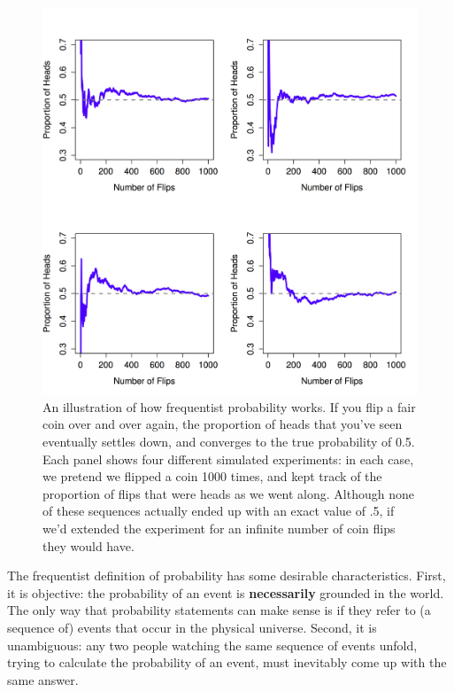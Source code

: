 \documentclass[
]{book}
\begin{document}
\begin{figure}
\centering
\includegraphics{navarro_img/probability/frequentistProb-eps-converted-to.png}
\caption{\label{fig:4FreqProb}An illustration of how frequentist probability works. If you flip a fair coin over and over again, the proportion of heads that you've seen eventually settles down, and converges to the true probability of 0.5. Each panel shows four different simulated experiments: in each case, we pretend we flipped a coin 1000 times, and kept track of the proportion of flips that were heads as we went along. Although none of these sequences actually ended up with an exact value of .5, if we'd extended the experiment for an infinite number of coin flips they would have.}
\end{figure}

The frequentist definition of probability has some desirable characteristics. First, it is objective: the probability of an event is \textbf{necessarily} grounded in the world. The only way that probability statements can make sense is if they refer to (a sequence of) events that occur in the physical universe. Second, it is unambiguous: any two people watching the same sequence of events unfold, trying to calculate the probability of an event, must inevitably come up with the same answer.
\end{document}
